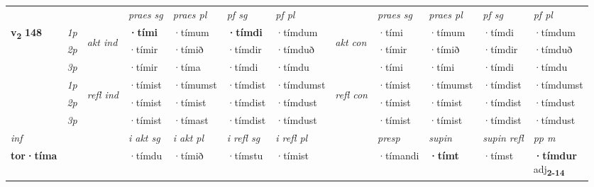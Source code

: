 \begin{longtable}[l]{X>{\footnotesize\itshape}llXXXXlXXXX}
 & &   & \textit{praes sg}  & \textit{praes pl}    & \textit{ pf sg} & \textit{pf pl} & & \textit{praes sg}  & \textit{praes pl}    & \textit{pf sg} & \textit{pf pl }  \\ \cmidrule{4-7} \cmidrule{9-12}
 \multirow{2}{*}{{{\textbf{v{\textsubscript{2}}} \Large{\textbf{148}}}}}  & 1p & \multirow{3}{*}{\begin{turn}{90}\textit{akt ind}\end{turn}} & \textbf{·tími} & ·tímum & \textbf{·tímdi} & ·tímdum & \multirow{3}{*}{\begin{turn}{90}\textit{akt con}\end{turn}} &·tími & ·tímum & ·tímdi & ·tímdum\\*
 & 2p &  &  ·tímir  & ·tímið & ·tímdir & ·tímduð & & ·tímir & ·tímið & ·tímdir & ·tímduð \\*
 & 3p &  & ·tímir & ·tíma & ·tímdi & ·tímdu & & ·tími & ·tími& ·tímdi & ·tímdu \\*
\cmidrule{4-7} \cmidrule{9-12}
 & 1p & \multirow{3}{*}{\begin{turn}{90}\textit{refl ind}\end{turn}}  & ·tímist & ·tímumst & ·tímdist & ·tímdumst & \multirow{3}{*}{\begin{turn}{90}\textit{refl con}\end{turn}}  &·tímist & ·tímumst & ·tímdist & ·tímdumst \\*
 & 2p &  & ·tímist & ·tímist & ·tímdist & ·tímdust & &·tímist & ·tímist & ·tímdist & ·tímdust \\*
 & 3p  & & ·tímist & ·tímast & ·tímdist & ·tímdust & & ·tímist & ·tímist& ·tímdist & ·tímdust \\*
\cmidrule{4-7} \cmidrule{9-12}

   {\textit{inf}} & &  & \textit{i akt sg} & \textit{i akt pl} & \textit{i refl sg} & \textit{i refl pl} && \textit{presp} & \textit{supin} & \textit{supin refl} & \textit{pp m} \\*
  {\textbf{tor\allowbreak ·tíma}} & && ·tímdu  & ·tímið & ·tímstu & ·tímist && ·tímandi &  \textbf{·tímt} & ·tímst & \specialcell{\textbf{·tímdur} \\ adj\textbf{\textsubscript{2-14}}} \\*

\midrule


\end{longtable}
